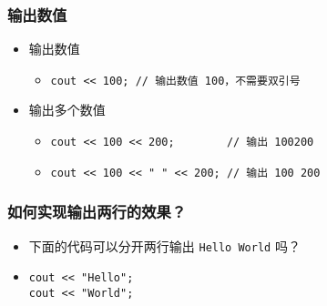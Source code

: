 \begin{frame}[fragile]
    \frametitle{输出数值}

    \begin{itemize}
        \item<1-> 输出数值

            \begin{itemize}
                \item \lstinline|cout << 100; // 输出数值 100，不需要双引号| 
            \end{itemize}

        \item<2-> 输出多个数值

            \begin{itemize}
                \item
                    \lstinline|cout << 100 << 200;        // 输出 100200| 
                \item
                    \lstinline|cout << 100 << " " << 200; // 输出 100 200| 
            \end{itemize}

    \end{itemize}
\end{frame}

\begin{frame}[fragile]
    \frametitle{如何实现输出两行的效果？}

    \begin{itemize}
        \item 下面的代码可以分开两行输出 \lstinline|Hello World| 吗？

        \item
            \lstinline|cout << "Hello";|\\ 
            \lstinline|cout << "World";|
    \end{itemize}
\end{frame}

